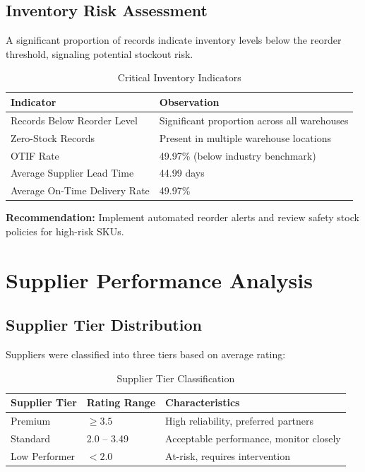 \documentclass[11pt,a4paper]{article}
\begin{document}
\subsection{Inventory Risk Assessment}

A significant proportion of records indicate inventory levels below the reorder threshold, signaling potential stockout risk.

\begin{table}[H]
\centering
\caption{Critical Inventory Indicators}
\label{tab:inventory}
\begin{tabular}{@{}ll@{}}
\toprule
\textbf{Indicator} & \textbf{Observation} \\
\midrule
Records Below Reorder Level & Significant proportion across all warehouses \\
Zero-Stock Records & Present in multiple warehouse locations \\
OTIF Rate & 49.97\% (below industry benchmark) \\
Average Supplier Lead Time & 44.99 days \\
Average On-Time Delivery Rate & 49.97\% \\
\bottomrule
\end{tabular}
\end{table}

\textbf{Recommendation:} Implement automated reorder alerts and review safety stock policies for high-risk SKUs.

\section{Supplier Performance Analysis}

\subsection{Supplier Tier Distribution}

Suppliers were classified into three tiers based on average rating:

\begin{table}[H]
\centering
\caption{Supplier Tier Classification}
\label{tab:tiers}
\begin{tabular}{@{}lll@{}}
\toprule
\textbf{Supplier Tier} & \textbf{Rating Range} & \textbf{Characteristics} \\
\midrule
Premium & $\geq 3.5$ & High reliability, preferred partners \\
Standard & 2.0 -- 3.49 & Acceptable performance, monitor closely \\
Low Performer & $< 2.0$ & At-risk, requires intervention \\
\bottomrule
\end{tabular}
\end{table}
\end{document}
